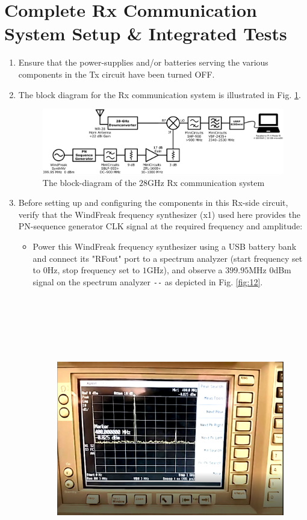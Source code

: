 \documentclass[12pt, draftcls, onecolumn]{IEEEtran}
\begin{document}
\section{Complete Rx Communication System Setup \& Integrated Tests}
\begin{enumerate}
    \item Ensure that the power-supplies and/or batteries serving the various components in the Tx circuit have been turned OFF.
    \item The block diagram for the Rx communication system is illustrated in Fig. \ref{fig:11}.
    \begin{figure}
        \centering
        \includegraphics[width=1.0\linewidth]{15_m.png}
        \caption{The block-diagram of the $28$GHz Rx communication system}
        \label{fig:11}
    \end{figure}
    \item Before setting up and configuring the components in this Rx-side circuit, verify that the WindFreak frequency synthesizer (x1) used here provides the PN-sequence generator CLK signal at the required frequency and amplitude:
    \begin{itemize}
        \item Power this WindFreak frequency synthesizer using a USB battery bank and connect its "RFout" port to a spectrum analyzer (start frequency set to $0$Hz, stop frequency set to $1$GHz), and observe a $399.95$MHz $0$dBm signal on the spectrum analyzer \texttt{-{}-} as depicted in Fig. \ref{fig:12}.
        \begin{figure}
        \centering
        \includegraphics[width=15cm, height=12.5cm]{8.png}

\end{figure}
\end{itemize}
\end{enumerate}
\end{document}
